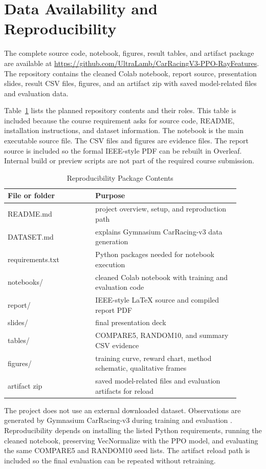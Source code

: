 \documentclass[conference]{IEEEtran}
\begin{document}
\section*{Data Availability and Reproducibility}

The complete source code, notebook, figures, result tables, and artifact package are available at \url{https://github.com/UltraLamb/CarRacingV3-PPO-RayFeatures}. The repository contains the cleaned Colab notebook, report source, presentation slides, result CSV files, figures, and an artifact zip with saved model-related files and evaluation data.

Table~\ref{tab:repro} lists the planned repository contents and their roles. This table is included because the course requirement asks for source code, README, installation instructions, and dataset information. The notebook is the main executable source file. The CSV files and figures are evidence files. The report source is included so the formal IEEE-style PDF can be rebuilt in Overleaf. Internal build or preview scripts are not part of the required course submission.

\begin{table}[t]
\caption{Reproducibility Package Contents}
\label{tab:repro}
\centering
\scriptsize
\begin{tabular}{p{0.34\linewidth}p{0.56\linewidth}}
\toprule
File or folder & Purpose \\
\midrule
README.md & project overview, setup, and reproduction path \\
DATASET.md & explains Gymnasium CarRacing-v3 data generation \\
requirements.txt & Python packages needed for notebook execution \\
notebooks/ & cleaned Colab notebook with training and evaluation code \\
report/ & IEEE-style LaTeX source and compiled report PDF \\
slides/ & final presentation deck \\
tables/ & COMPARE5, RANDOM10, and summary CSV evidence \\
figures/ & training curve, reward chart, method schematic, qualitative frames \\
artifact zip & saved model-related files and evaluation artifacts for reload \\
\bottomrule
\end{tabular}
\end{table}

The project does not use an external downloaded dataset. Observations are generated by Gymnasium CarRacing-v3 during training and evaluation \cite{ref1}. Reproducibility depends on installing the listed Python requirements, running the cleaned notebook, preserving VecNormalize with the PPO model, and evaluating the same COMPARE5 and RANDOM10 seed lists. The artifact reload path is included so the final evaluation can be repeated without retraining.
\end{document}
